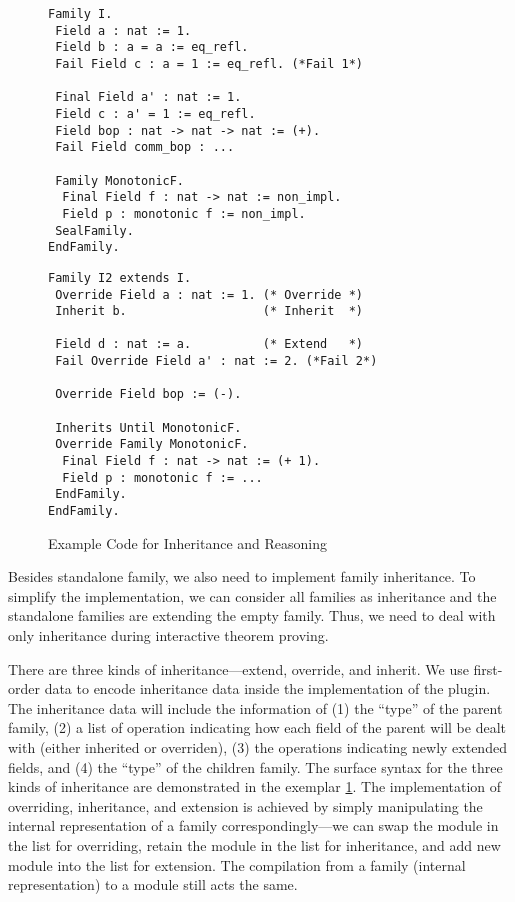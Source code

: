 \begin{figure}[!htb]
  \begin{minipage}[t]{0.45\linewidth}
\begin{verbatim}
Family I.
 Field a : nat := 1.
 Field b : a = a := eq_refl.
 Fail Field c : a = 1 := eq_refl. (*Fail 1*)

 Final Field a' : nat := 1.
 Field c : a' = 1 := eq_refl.
 Field bop : nat -> nat -> nat := (+).
 Fail Field comm_bop : ...

 Family MonotonicF.
  Final Field f : nat -> nat := non_impl.
  Field p : monotonic f := non_impl.
 SealFamily. 
EndFamily.
\end{verbatim}
  \end{minipage}
\begin{minipage}[t]{0.45\linewidth}
\begin{verbatim}
Family I2 extends I.
 Override Field a : nat := 1. (* Override *)
 Inherit b.                   (* Inherit  *)

 Field d : nat := a.          (* Extend   *)
 Fail Override Field a' : nat := 2. (*Fail 2*)

 Override Field bop := (-).

 Inherits Until MonotonicF.
 Override Family MonotonicF.
  Final Field f : nat -> nat := (+ 1).
  Field p : monotonic f := ...
 EndFamily. 
EndFamily.
\end{verbatim}
  \end{minipage}
  \caption{Example Code for Inheritance and Reasoning}\label{fig:plugin-example3}
\end{figure}

Besides standalone family, we also need to implement family inheritance.
To simplify the implementation, we can consider all families as
inheritance and the standalone families are extending the empty family.
Thus, we need to deal with only inheritance during interactive theorem proving.


There are three kinds of inheritance---extend, override, and inherit. We
use first-order data to encode inheritance data inside the
implementation of the plugin. The inheritance data will include the
information of (1) the ``type'' of the parent family, (2) a list of
operation indicating how each field of the parent will be dealt with
(either inherited or overriden), (3) the operations indicating newly
extended fields, and (4) the ``type'' of the children family.
The surface syntax for the three kinds of inheritance
are demonstrated in the exemplar \cref*{fig:plugin-example3}. The
implementation of overriding, inheritance, and extension is achieved by
simply manipulating the internal representation of a family
correspondingly---we can swap the module in the list for overriding,
retain the module in the list for inheritance, and add new module into
the list for extension. The compilation from a family (internal
representation) to a module still acts the same.

